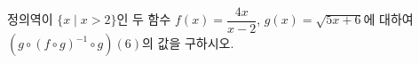 정의역이 $\{x \mid x>2\}$인 두 함수 $f(x)=\dfrac{4x}{x-2}$, $g(x)=\sqrt{5x+6}$에 대하여 $(g\circ(f\circ g)^{-1}\circ g)(6)$의 값을 구하시오.
